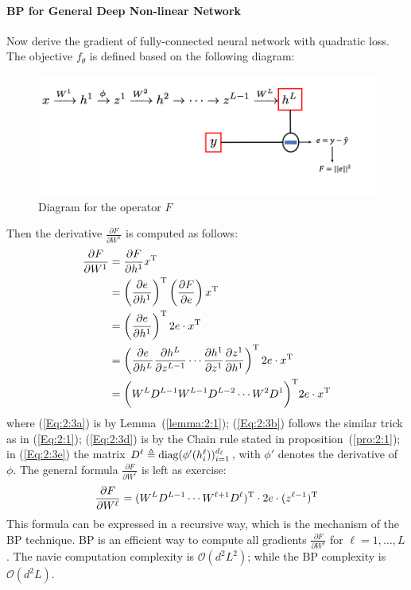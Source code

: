 \paragraph{BP for General Deep Non-linear Network}
Now derive the gradient of fully-connected neural network with quadratic loss. 
The objective $f_\theta$ is defined based on the following diagram:
\begin{figure}[H]
\centering
\includegraphics[width=\textwidth]{Second_lecture/p_4}
\caption{Diagram for the operator $F$}
\end{figure}
Then the derivative $\frac{\partial F}{\partial W^1}$ is computed as follows:
\begin{subequations}
\begin{align}
\frac{\partial F}{\partial W^1} &= \frac{\partial F}{\partial h^1}x^{\mathrm T}\label{Eq:2:3a}\\
&=\left(\frac{\partial e}{\partial h^1}\right)^{\mathrm T}\left(\frac{\partial F}{\partial e}\right)x^{\mathrm T}\label{Eq:2:3b}\\
&=\left(\frac{\partial e}{\partial h^1}\right)^{\mathrm T} 2e\cdot x^{\mathrm T}\nonumber\\
&=\left(
\frac{\partial e}{\partial h^L}\frac{\partial h^L}{\partial z^{L-1}}\cdots\frac{\partial h^1}{\partial z^1}\frac{\partial z^1}{\partial h^1}
\right)^{\mathrm T}2e\cdot x^{\mathrm T}\label{Eq:2:3d}\\
&=\bigg(W^LD^{L-1}W^{L-1}D^{L-2}\cdots W^2D^1\bigg)^{\mathrm T}2e\cdot x^{\mathrm T}\label{Eq:2:3e}
\end{align}
\end{subequations}
where (\ref{Eq:2:3a}) is by Lemma~(\ref{lemma:2:1});
(\ref{Eq:2:3b}) follows the similar trick as in (\ref{Eq:2:1});
(\ref{Eq:2:3d}) is by the Chain rule stated in proposition~(\ref{pro:2:1});
in (\ref{Eq:2:3e}) the matrix $D^{\ell}\triangleq\operatorname{diag}(\phi'(h_i^{\ell}))_{i=1}^{d_{\ell}}$, with $\phi'$ denotes the derivative of $\phi$.
The general formula $\frac{\partial F}{\partial W^{\ell}}$ is left as exercise: 
\[
\frac{\partial F}{\partial W^{\ell}}=
(W^{L}D^{L-1}\cdots W^{\ell+1}D^{\ell})^{\mathrm T}\cdot 2e\cdot(z^{\ell-1})^{\mathrm T}
\]
This formula can be expressed in a recursive way, which is the mechanism of the BP technique.  
BP is an efficient way to compute all gradients $\frac{\partial F}{\partial W^{\ell}}$ for $\ell=1,\dots,L$.
The navie computation complexity is $\mathcal{O}(d^2L^2)$; while the BP complexity is $\mathcal{O}(d^2L)$.


